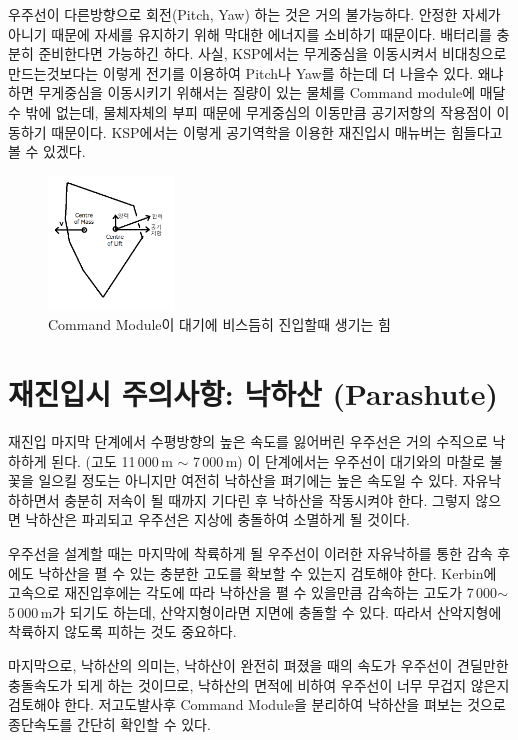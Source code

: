 \documentclass[9pt,twoside,openany]{amsbook}
\begin{document}
우주선이 다른방향으로 회전(Pitch, Yaw) 하는 것은 거의 불가능하다. 안정한 자세가 아니기 때문에 자세를 유지하기 위해 막대한 에너지를 소비하기 때문이다. 배터리를 충분히 준비한다면 가능하긴 하다. 사실, KSP에서는 무게중심을 이동시켜서 비대칭으로 만드는것보다는 이렇게 전기를 이용하여 Pitch나 Yaw를 하는데 더 나을수 있다. 왜냐하면 무게중심을 이동시키기 위해서는 질량이 있는 물체를 Command module에 매달수 밖에 없는데, 물체자체의 부피 때문에 무게중심의 이동만큼 공기저항의 작용점이 이동하기 때문이다. KSP에서는 이렇게 공기역학을 이용한 재진입시 매뉴버는 힘들다고 볼 수 있겠다.

\begin{figure}[h]
\caption{Command Module이 대기에 비스듬히 진입할때 생기는 힘}
\includegraphics[width=0.3\textwidth]{lift.png}
\end{figure}

\section{재진입시 주의사항: 낙하산 (Parashute)}
재진입 마지막 단계에서 수평방향의 높은 속도를 잃어버린 우주선은 거의 수직으로 낙하하게 된다. (고도 11\,000\,m $\sim$ 7\,000\,m) 이 단계에서는 우주선이 대기와의 마찰로 불꽃을 일으킬 정도는 아니지만 여전히 낙하산을 펴기에는 높은 속도일 수 있다. 자유낙하하면서 충분히 저속이 될 때까지 기다린 후 낙하산을 작동시켜야 한다. 그렇지 않으면 낙하산은 파괴되고 우주선은 지상에 충돌하여 소멸하게 될 것이다.

우주선을 설계할 때는 마지막에 착륙하게 될 우주선이 이러한 자유낙하를 통한 감속 후에도 낙하산을 펼 수 있는 충분한 고도를 확보할 수 있는지 검토해야 한다. Kerbin에 고속으로 재진입후에는 각도에 따라 낙하산을 펼 수 있을만큼 감속하는 고도가 7\,000$\sim$5\,000\,m가 되기도 하는데, 산악지형이라면 지면에 충돌할 수 있다. 따라서 산악지형에 착륙하지 않도록 피하는 것도 중요하다.

마지막으로, 낙하산의 의미는, 낙하산이 완전히 펴졌을 때의 속도가 우주선이 견딜만한 충돌속도가 되게 하는 것이므로, 낙하산의 면적에 비하여 우주선이 너무 무겁지 않은지 검토해야 한다. 저고도발사후 Command Module을 분리하여 낙하산을 펴보는 것으로 종단속도를 간단히 확인할 수 있다.
\end{document}
